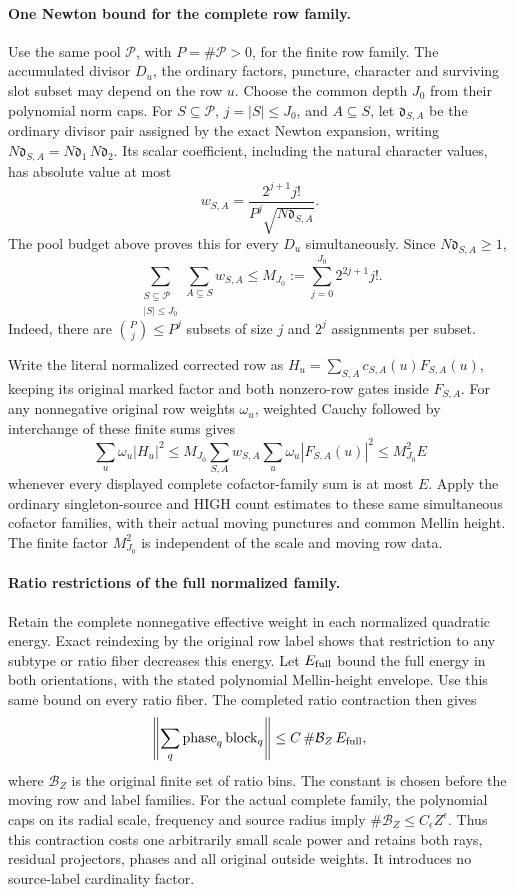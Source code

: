 \paragraph{One Newton bound for the complete row family.}
Use the same pool \(\mathcal P\), with \(P=\#\mathcal P>0\),
for the finite row family. The accumulated divisor \(D_u\), the
ordinary factors, puncture, character and surviving slot subset may
depend on the row \(u\). Choose the common depth \(J_0\) from their
polynomial norm caps. For \(S\subseteq\mathcal P\), \(j=|S|\le J_0\),
and \(A\subseteq S\), let \(\mathfrak d_{S,A}\) be the ordinary
divisor pair assigned by the exact Newton expansion, writing
\(N\mathfrak d_{S,A}=N\mathfrak d_1\,N\mathfrak d_2\). Its scalar
coefficient, including the natural character values, has absolute value
at most
\[
 w_{S,A}=\frac{2^{j+1}j!}{P^j\sqrt{N\mathfrak d_{S,A}}}.
\]
The pool budget above proves this for every \(D_u\) simultaneously.
Since \(N\mathfrak d_{S,A}\ge1\),
\[
 \sum_{\substack{S\subseteq\mathcal P\\|S|\le J_0}}
 \sum_{A\subseteq S}w_{S,A}
 \le M_{J_0}:=\sum_{j=0}^{J_0}2^{2j+1}j!.
\]
Indeed, there are \(\binom Pj\le P^j\) subsets of size \(j\)
and \(2^j\) assignments per subset.

Write the literal normalized corrected row as
\(H_u=\sum_{S,A}c_{S,A}(u)F_{S,A}(u)\), keeping its original
marked factor and both nonzero-row gates inside \(F_{S,A}\).
For any nonnegative original row weights \(\omega_u\), weighted
Cauchy followed by interchange of these finite sums gives
\[
 \sum_u\omega_u|H_u|^2
 \le M_{J_0}\sum_{S,A}w_{S,A}
          \sum_u\omega_u|F_{S,A}(u)|^2
 \le M_{J_0}^2 E
\]
whenever every displayed complete cofactor-family sum is at most \(E\).
Apply the ordinary singleton-source and HIGH count estimates to these
same simultaneous cofactor families, with their actual moving punctures
and common Mellin height. The finite factor \(M_{J_0}^2\) is independent
of the scale and moving row data.

\paragraph{Ratio restrictions of the full normalized family.}
Retain the complete nonnegative effective weight in each normalized
quadratic energy. Exact reindexing by the original row label shows
that restriction to any subtype or ratio fiber decreases this energy.
Let \(E_{\rm full}\) bound the full energy in both orientations,
with the stated polynomial Mellin-height envelope. Use this same
bound on every ratio fiber. The completed ratio contraction then gives
\[
 \left\|\sum_q\operatorname{phase}_q\operatorname{block}_q\right\|
 \le C\,\#\mathcal B_Z\,E_{\rm full},
\]
where \(\mathcal B_Z\) is the original finite set of ratio bins.
The constant is chosen before the moving row and label families.
For the actual complete family, the polynomial caps on its radial
scale, frequency and source radius imply
\(\#\mathcal B_Z\le C_\epsilon Z^\epsilon\).
Thus this contraction costs one arbitrarily small scale power and
retains both rays, residual projectors, phases and all original
outside weights. It introduces no source-label cardinality factor.

